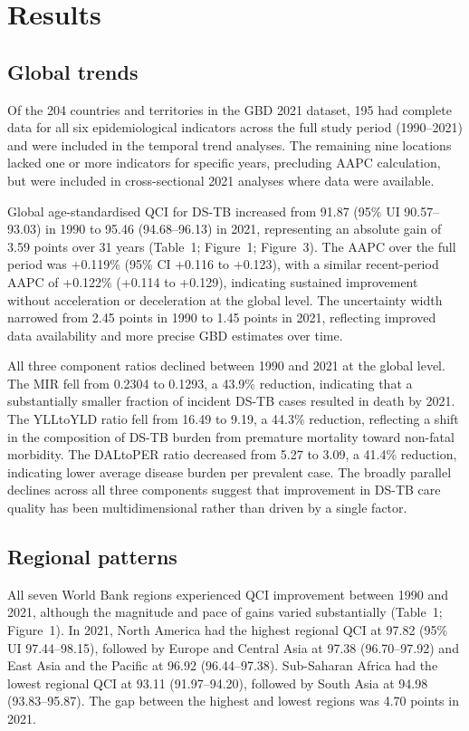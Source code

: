 \documentclass[12pt]{article}
\begin{document}
\section{Results}

\subsection{Global trends}

Of the 204 countries and territories in the GBD 2021 dataset, 195 had complete data for all six epidemiological indicators across the full study period (1990--2021) and were included in the temporal trend analyses. The remaining nine locations lacked one or more indicators for specific years, precluding AAPC calculation, but were included in cross-sectional 2021 analyses where data were available.

Global age-standardised QCI for DS-TB increased from 91.87 (95\% UI 90.57--93.03) in 1990 to 95.46 (94.68--96.13) in 2021, representing an absolute gain of 3.59 points over 31 years (Table~1; Figure~1; Figure~3). The AAPC over the full period was +0.119\% (95\% CI +0.116 to +0.123), with a similar recent-period AAPC of +0.122\% (+0.114 to +0.129), indicating sustained improvement without acceleration or deceleration at the global level. The uncertainty width narrowed from 2.45 points in 1990 to 1.45 points in 2021, reflecting improved data availability and more precise GBD estimates over time.

All three component ratios declined between 1990 and 2021 at the global level. The MIR fell from 0.2304 to 0.1293, a 43.9\% reduction, indicating that a substantially smaller fraction of incident DS-TB cases resulted in death by 2021. The YLLtoYLD ratio fell from 16.49 to 9.19, a 44.3\% reduction, reflecting a shift in the composition of DS-TB burden from premature mortality toward non-fatal morbidity. The DALtoPER ratio decreased from 5.27 to 3.09, a 41.4\% reduction, indicating lower average disease burden per prevalent case. The broadly parallel declines across all three components suggest that improvement in DS-TB care quality has been multidimensional rather than driven by a single factor.

\subsection{Regional patterns}

All seven World Bank regions experienced QCI improvement between 1990 and 2021, although the magnitude and pace of gains varied substantially (Table~1; Figure~1). In 2021, North America had the highest regional QCI at 97.82 (95\% UI 97.44--98.15), followed by Europe and Central Asia at 97.38 (96.70--97.92) and East Asia and the Pacific at 96.92 (96.44--97.38). Sub-Saharan Africa had the lowest regional QCI at 93.11 (91.97--94.20), followed by South Asia at 94.98 (93.83--95.87). The gap between the highest and lowest regions was 4.70 points in 2021.
\end{document}
